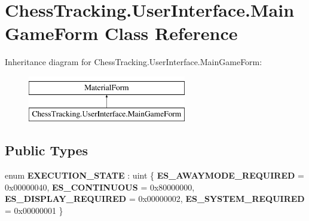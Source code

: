 \hypertarget{class_chess_tracking_1_1_user_interface_1_1_main_game_form}{}\section{Chess\+Tracking.\+User\+Interface.\+Main\+Game\+Form Class Reference}
\label{class_chess_tracking_1_1_user_interface_1_1_main_game_form}
Inheritance diagram for Chess\+Tracking.\+User\+Interface.\+Main\+Game\+Form\+:\begin{figure}[H]
\begin{center}
\leavevmode
\includegraphics[height=2.000000cm]{class_chess_tracking_1_1_user_interface_1_1_main_game_form}
\end{center}
\end{figure}
\subsection*{Public Types}
\begin{DoxyCompactItemize}
\item 
\mbox{\label{class_chess_tracking_1_1_user_interface_1_1_main_game_form_ae3aa157e0c49ee1596535bdf281c6693}} 
enum {\bfseries E\+X\+E\+C\+U\+T\+I\+O\+N\+\_\+\+S\+T\+A\+TE} \+: uint \{ {\bfseries E\+S\+\_\+\+A\+W\+A\+Y\+M\+O\+D\+E\+\_\+\+R\+E\+Q\+U\+I\+R\+ED} = 0x00000040, 
{\bfseries E\+S\+\_\+\+C\+O\+N\+T\+I\+N\+U\+O\+US} = 0x80000000, 
{\bfseries E\+S\+\_\+\+D\+I\+S\+P\+L\+A\+Y\+\_\+\+R\+E\+Q\+U\+I\+R\+ED} = 0x00000002, 
{\bfseries E\+S\+\_\+\+S\+Y\+S\+T\+E\+M\+\_\+\+R\+E\+Q\+U\+I\+R\+ED} = 0x00000001
 \}
\end{DoxyCompactItemize}
